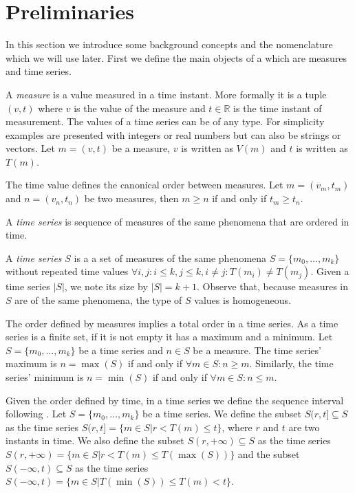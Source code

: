 \section{Preliminaries}
\label{sec:model:preliminaries}

In this section we introduce some background concepts and the
nomenclature which we will use later.  First we define the main
objects of a  which are measures and time series.

A \emph{measure} is a value measured in a time instant. More formally
it is a tuple $(v,t)$ where $v$ is the value of the measure and $t \in
\mathbb{R}$ is the time instant of measurement.  The values of a time
series can be of any type. For simplicity examples are presented with
integers or real numbers but can also be strings or vectors.  Let $m =
(v,t)$ be a measure, $v$ is written as $V(m)$ and $t$ is written as
$T(m)$.

The time value defines the canonical order between measures.  Let $m =
(v_m, t_m)$ and $n = (v_n, t_n)$ be two measures, then $m\geq n$ if
and only if $t_m\geq t_n$.

A \emph{time series} is sequence of measures of the same phenomena
that are ordered in time.
\begin{definition}
  A \emph{time series} $S$ is a a set of measures of the same
  phenomena $S = \{m_0, \ldots, m_k\}$ without repeated time values
  $\forall i,j: i\leq k, j\leq k, i\neq j : T(m_i)\neq T(m_j)$. Given
  a time series $|S|$, we note its size by $|S|=k+1$. Observe that,
  because measures in $S$ are of the same phenomena, the type of $S$
  values is homogeneous.
\end{definition}

The order defined by measures implies a total order in a time
series. As a time series is a finite set, if it is not empty it has a
maximum and a minimum.  Let $S=\{m_0,\ldots,m_k\}$ be a time series
and $n\in S$ be a measure. The time series' maximum is $n=\max(S)$ if
and only if $\forall m \in S: n \geq m $.  Similarly, the time series'
minimum is $n=\min(S)$ if and only if $\forall m \in S: n \leq m$.

Given the order defined by time, in a time series we define the
sequence interval following \cite{last:keogh,last:hetland}.  Let
$S=\{m_0, \ldots, m_k\}$ be a time series. We define the subset
$S(r,t] \subseteq S$ as the time series $S(r,t]=\{m\in S | r<T(m)\leq
t\}$, where $r$ and $t$ are two instants in time.  We also define the
subset $S(r,+\infty)\subseteq S$ as the time series $S(r,+\infty) =
\{m\in S | r< T(m) \leq T(\max(S))\}$ and the subset
$S(-\infty,t)\subseteq S$ as the time series $S(-\infty,t) = \{m\in S
| T(\min(S))\leq T(m) < t\}$.

